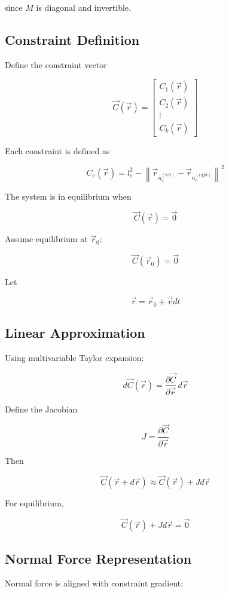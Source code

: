 since $M$ is diagonal and invertible.

\subsection*{Constraint Definition}

Define the constraint vector

\[
\vec{C}(\vec{r}) =
\begin{bmatrix}
C_1(\vec{r}) \\
C_2(\vec{r}) \\
\vdots \\
C_k(\vec{r})
\end{bmatrix}
\]

Each constraint is defined as

\[
C_e(\vec{r}) =
l_e^2 -
\left\|
\vec{r}_{n_e^{(\mathrm{left})}} -
\vec{r}_{n_e^{(\mathrm{right})}}
\right\|^2
\]

The system is in equilibrium when

\[
\vec{C}(\vec{r}) = \vec{0}
\]

Assume equilibrium at $\vec{r}_0$:

\[
\vec{C}(\vec{r}_0) = \vec{0}
\tag{2}
\]

Let

\[
\vec{r} = \vec{r}_0 + \vec{v} dt
\]

\subsection*{Linear Approximation}

Using multivariable Taylor expansion:

\[
d\vec{C}(\vec{r})
=
\frac{\partial \vec{C}}{\partial \vec{r}}
\, d\vec{r}
\]

Define the Jacobian

\[
J =
\frac{\partial \vec{C}}{\partial \vec{r}}
\]

Then

\[
\vec{C}(\vec{r} + d\vec{r})
\approx
\vec{C}(\vec{r})
+
J d\vec{r}
\]

For equilibrium,

\[
\vec{C}(\vec{r}) + J d\vec{r} = \vec{0}
\tag{3}
\]

\subsection*{Normal Force Representation}

Normal force is aligned with constraint gradient:


